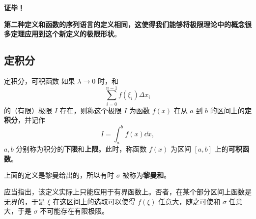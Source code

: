 \textbf{证毕！}

\textbf{第二种定义和函数的序列语言的定义相同，这使得我们能够将极限理论中的概念很多定理应用到这个新定义的极限形状}。
\subsection{定积分}
\begin{definition}{定积分，可积函数}\label{def_DInt_3}
如果 $\lambda\rightarrow0$ 时，和  
\begin{equation}
\sum_{i=0}^{n-1}f(\xi_i)\Delta x_i
\end{equation}
的（有限）极限 $I$ 存在，则称这个极限 $I$ 为函数 $f(x)$ 在从 $a$ 到 $b$ 的区间上的\textbf{定积分}，并记作
\begin{equation}
I=\int_a^bf(x)\dd x,
\end{equation}
$a,b$ 分别称为积分的\textbf{下限}和\textbf{上限}。此时，称函数 $f(x)$ 为区间 $[a,b]$ 上的\textbf{可积函数}。
\end{definition}

上面的定义是黎曼给出的，所以有时 $\sigma$ 被称为\textbf{黎曼和}。

应当指出，该定义实际上只能应用于有界函数上。否者，在某个部分区间上函数是无界的，于是 $\xi$ 在这区间上的选取可以使得 $f(\xi)$ 任意大，随之可使和 $\sigma$ 任意大，于是 $\sigma$ 不可能存在有限极限。